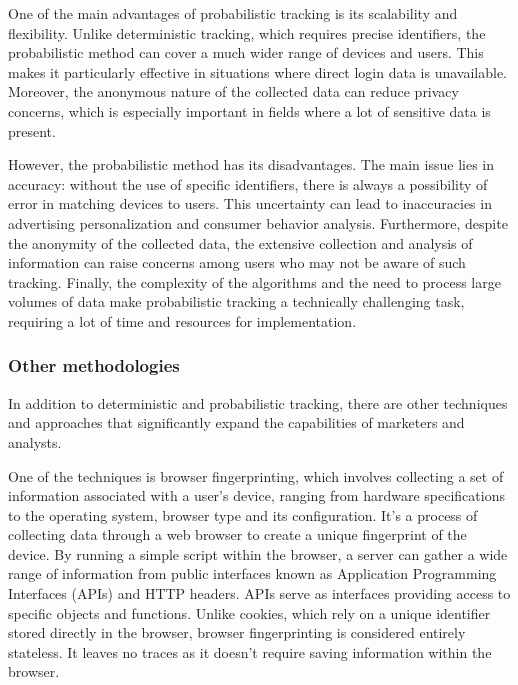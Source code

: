 One of the main advantages of probabilistic tracking is its scalability and flexibility. Unlike deterministic tracking, which requires precise identifiers, the probabilistic method can cover a much wider range of devices and users. This makes it particularly effective in situations where direct login data is unavailable. Moreover, the anonymous nature of the collected data can reduce privacy concerns, which is especially important in fields where a lot of sensitive data is present.

However, the probabilistic method has its disadvantages. The main issue lies in accuracy: without the use of specific identifiers, there is always a possibility of error in matching devices to users. This uncertainty can lead to inaccuracies in advertising personalization and consumer behavior analysis. Furthermore, despite the anonymity of the collected data, the extensive collection and analysis of information can raise concerns among users who may not be aware of such tracking. Finally, the complexity of the algorithms and the need to process large volumes of data make probabilistic tracking a technically challenging task, requiring a lot of time and resources for implementation.\cite{FTC} 

\subsubsection{Other methodologies}
In addition to deterministic and probabilistic tracking, there are other techniques and approaches that significantly expand the capabilities of marketers and analysts.

One of the techniques is browser fingerprinting, which involves collecting a set of information associated with a user's device, ranging from hardware specifications to the operating system, browser type and its configuration. It's a process of collecting data through a web browser to create a unique fingerprint of the device. By running a simple script within the browser, a server can gather a wide range of information from public interfaces known as Application Programming Interfaces (APIs) and HTTP headers. APIs serve as interfaces providing access to specific objects and functions. Unlike cookies, which rely on a unique identifier stored directly in the browser, browser fingerprinting is considered entirely stateless. It leaves no traces as it doesn't require saving information within the browser.\cite{Laperdrix2019BrowserFingerprinting}

